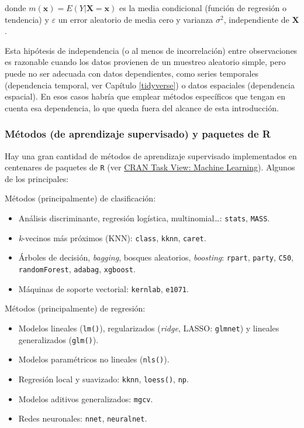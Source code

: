 \documentclass[
]{book}
\providecommand{\tightlist}{%
  \setlength{\itemsep}{0pt}\setlength{\parskip}{0pt}}
\renewcommand{\mathbf}[1]{\symbf{#1}}
\theoremstyle{break}
\theoremstyle{nonumberplain}
\begin{document}
donde \(m(\mathbf{x}) = E\left( \left. Y\right\vert \mathbf{X}=\mathbf{x} \right)\) es la media condicional (función de regresión o tendencia) y \(\varepsilon\) un error aleatorio de media cero y varianza \(\sigma^2\), independiente de \(\mathbf{X}\).

Esta hipótesis de independencia (o al menos de incorrelación) entre observaciones es razonable cuando los datos provienen de un muestreo aleatorio simple, pero puede no ser adecuada con datos dependientes, como series temporales (dependencia temporal, ver Capítulo \ref{tidyverse}) o datos espaciales (dependencia espacial). En esos casos habría que emplear métodos específicos que tengan en cuenta esa dependencia, lo que queda fuera del alcance de esta introducción.

\subsubsection{Métodos (de aprendizaje supervisado) y paquetes de R}\label{metodos-pkgs}

Hay una gran cantidad de métodos de aprendizaje supervisado implementados en centenares de paquetes de \texttt{R} (ver \href{https://cran.r-project.org/web/views/MachineLearning.html}{CRAN Task View: Machine Learning}). Algunos de los principales:

Métodos (principalmente) de clasificación:

\begin{itemize}
\tightlist
\item
  Análisis discriminante, regresión logística, multinomial\ldots: \texttt{stats}, \texttt{MASS}.
\item
  \emph{k}-vecinos más próximos (KNN): \texttt{class}, \texttt{kknn}, \texttt{caret}.
\item
  Árboles de decisión, \emph{bagging}, bosques aleatorios, \emph{boosting}: \texttt{rpart}, \texttt{party}, \texttt{C50}, \texttt{randomForest}, \texttt{adabag}, \texttt{xgboost}.
\item
  Máquinas de soporte vectorial: \texttt{kernlab}, \texttt{e1071}.
\end{itemize}

Métodos (principalmente) de regresión:

\begin{itemize}
\tightlist
\item
  Modelos lineales (\texttt{lm()}), regularizados (\emph{ridge}, LASSO: \texttt{glmnet}) y lineales generalizados (\texttt{glm()}).
\item
  Modelos paramétricos no lineales (\texttt{nls()}).
\item
  Regresión local y suavizado: \texttt{kknn}, \texttt{loess()}, \texttt{np}.
\item
  Modelos aditivos generalizados: \texttt{mgcv}.
\item
  Redes neuronales: \texttt{nnet}, \texttt{neuralnet}.
\end{itemize}
\end{document}
